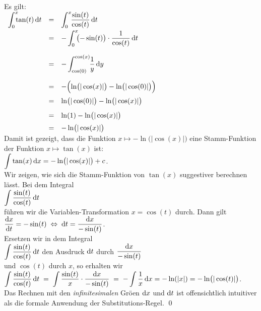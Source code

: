 \solution
Es gilt:
\\[0.2cm]
\hspace*{1.3cm}
$
\begin{array}[t]{lcl}
       \dint{0}{x} \tan(t) \, \dr t 
 & = & \dint{0}{x} \;\frac{\sin(t)}{\cos(t)}\, \dr t \\[0.3cm]
 & = & - \dint{0}{x} \;\bigl(- \sin(t)\bigr)\cdot \frac{1}{\cos(t)}\, \dr t \\[0.6cm]
 & = & - \dint{\cos(0)}{\cos(x)} \;\frac{1}{y}\, \dr y \\[0.6cm]
 & = & - \Bigl( \ln\bigl(|\cos(x)|\bigr) - \ln\bigl(|\cos(0)|\bigr) \Bigr) \\[0.3cm]
 & = & \ln\bigl(|\cos(0)|\bigr) - \ln\bigl(|\cos(x)|\bigr) \\[0.3cm]
 & = & \ln(1) - \ln\bigl(|\cos(x)|\bigr) \\[0.2cm]
 & = & - \ln\bigl(|\cos(x)|\bigr) 
\end{array}
$
\\[0.2cm]
Damit ist gezeigt, dass die Funktion  $x \mapsto -\ln\bigl(|\cos(x)|\bigr)$ eine Stamm-Funktion der
Funktion $x\mapsto\tan(x)$ ist:
\\[0.2cm]
\hspace*{1.3cm} $\displaystyle\int\tan(x)\, \textrm{d} x = - \ln\bigl(|\cos(x)|\bigr) + c$.
\\[0.2cm]
Wir zeigen, wie sich die Stamm-Funktion von $\tan(x)$ suggestiver berechnen l\"asst.  Bei dem
Integral
\\[0.2cm]
\hspace*{1.3cm}
 $\displaystyle\int \frac{\sin(t)}{\cos(t)}\,\textrm{d} t$ 
\\[0.2cm]
 f\"uhren wir die Variablen-Transformation $x =
\cos(t)$ durch.  Dann gilt
\\[0.2cm]
\hspace*{1.3cm}
 $\displaystyle\frac{\textrm{d} x}{\textrm{d} t} = -\sin(t) \;\Leftrightarrow\; \textrm{d} t = \frac{\textrm{d} x}{-\sin(t)}$.
\\[0.2cm]
Ersetzen wir in dem Integral
\\[0.2cm]
\hspace*{1.3cm}
 $\displaystyle\int \frac{\sin(t)}{\cos(t)}\,\textrm{d} t$ \quad den Ausdruck $\textrm{d} t$ durch \quad  $\displaystyle\frac{\textrm{d} x}{-\sin(t)}$ 
\\[0.2cm]
und $\cos(t)$ durch $x$,  so erhalten wir
\\[0.2cm]
\hspace*{1.3cm} 
$\displaystyle \int \frac{\sin(t)}{\cos(t)}\,\textrm{d} t \;=\; \int
\frac{\sin(t)}{x}\cdot \frac{\textrm{d} x}{-\sin(t)} \;=\; - \int \frac{1}{x}\, \textrm{d} x = -\ln(|x|) =
-\ln\bigl(|\cos(t)|\bigr) $.  
\\[0.2cm]
Das Rechnen mit den \emph{infinitesimalen} Gr\"o\3en $\textrm{d} x$ und $\textrm{d} t$ ist
offensichtlich intuitiver als die formale Anwendung der Substitutions-Regel.  \qed



